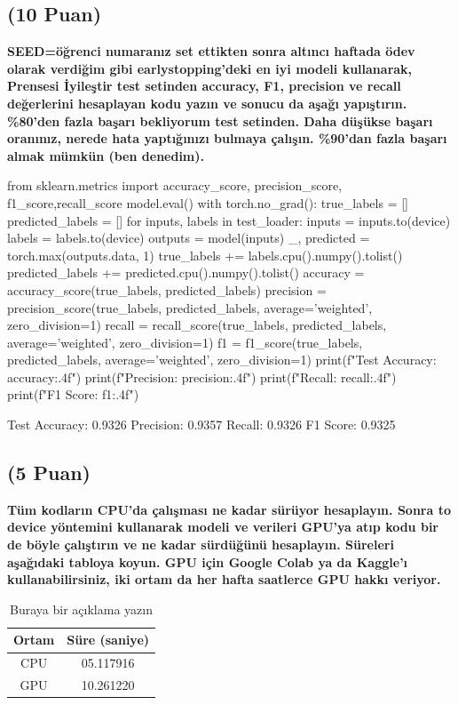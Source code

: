 \documentclass[11pt]{article}
\begin{document}
\newpage
\subsection{(10 Puan)} \textbf{SEED=öğrenci numaranız set ettikten sonra altıncı haftada ödev olarak verdiğim gibi earlystopping'deki en iyi modeli kullanarak, Prensesi İyileştir test setinden accuracy, F1, precision ve recall değerlerini hesaplayan kodu yazın ve sonucu da aşağı yapıştırın. \%80'den fazla başarı bekliyorum test setinden. Daha düşükse başarı oranınız, nerede hata yaptığınızı bulmaya çalışın. \%90'dan fazla başarı almak mümkün (ben denedim).}

\begin{python}
from sklearn.metrics import  accuracy_score, precision_score, f1_score,recall_score
model.eval()
with torch.no_grad():
    true_labels = []
    predicted_labels = []
    for inputs, labels in test_loader:
        inputs = inputs.to(device)
        labels = labels.to(device)
        outputs = model(inputs)
        _, predicted = torch.max(outputs.data, 1)
        true_labels += labels.cpu().numpy().tolist()
        predicted_labels += predicted.cpu().numpy().tolist()
accuracy = accuracy_score(true_labels, predicted_labels)
precision = precision_score(true_labels, predicted_labels, average='weighted', zero_division=1)
recall = recall_score(true_labels, predicted_labels, average='weighted', zero_division=1)
f1 = f1_score(true_labels, predicted_labels, average='weighted', zero_division=1)
print(f"Test Accuracy: {accuracy:.4f}")
print(f"Precision: {precision:.4f}")
print(f"Recall: {recall:.4f}")
print(f"F1 Score: {f1:.4f}")
\end{python}
Test Accuracy: 0.9326
Precision: 0.9357
Recall: 0.9326
F1 Score: 0.9325
\subsection{(5 Puan)} \textbf{Tüm kodların CPU'da çalışması ne kadar sürüyor hesaplayın. Sonra to device yöntemini kullanarak modeli ve verileri GPU'ya atıp kodu bir de böyle çalıştırın ve ne kadar sürdüğünü hesaplayın. Süreleri aşağıdaki tabloya koyun. GPU için Google Colab ya da Kaggle'ı kullanabilirsiniz, iki ortam da her hafta saatlerce GPU hakkı veriyor.}

\begin{table}[ht!]
    \centering
    \caption{Buraya bir açıklama yazın}
    \begin{tabular}{c|c}
        Ortam & Süre (saniye) \\\hline
        CPU & 05.117916 \\
        GPU & 10.261220  \\
    \end{tabular}
    \label{tab:my_table}
\end{table}
\end{document}
